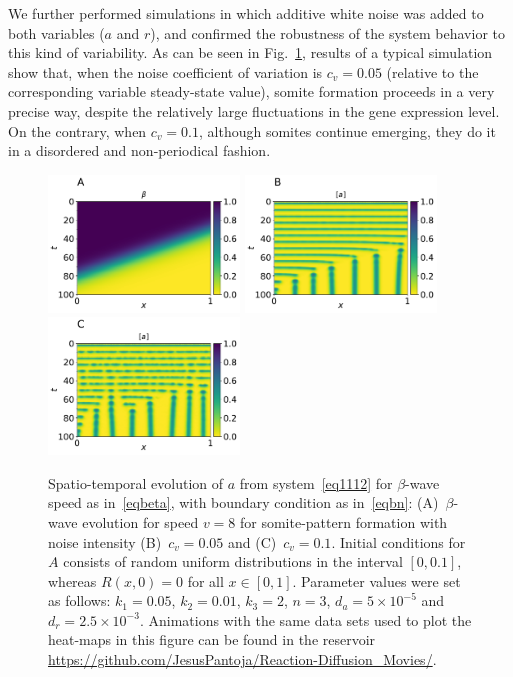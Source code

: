 \documentclass[%
 preprint,
 amsmath,amssymb,
 aps,
]{revtex4-2}
\begin{document}
	We further performed simulations in which additive white noise was added to
	both variables ($a$ and $r$), and confirmed the robustness of the system
	behavior to this kind of variability. As can be seen in Fig.~\ref{Fig05},
	results of a typical simulation show that, when the noise coefficient of
	variation is $c_v = 0.05$ (relative to the corresponding variable 
	steady-state value), somite formation proceeds in a very precise way,
	despite the relatively large fluctuations in the gene expression level. On the
	contrary, when $c_v = 0.1$, although somites continue emerging, they do it in 
	a disordered and non-periodical fashion.
	
	\begin{figure}[t!]
		\centering
		\includegraphics[width=2in]{Figures/Fig05aRev.pdf}
		\includegraphics[width=2in]{Figures/Fig05bRev.pdf} 
		\includegraphics[width=2in]{Figures/Fig05cRev.pdf} 
		\caption{Spatio-temporal evolution of $a$ from system~\eqref{eq1112} for
			$\beta$-wave speed as in~\eqref{eqbeta}, with boundary condition as
			in~\eqref{eqbn}: (A)~$\beta$-wave evolution for speed $v=8$ for somite-pattern
			formation with noise intensity (B)~$c_v=0.05$ and (C)~$c_v=0.1$. Initial
			conditions for $A$ consists of random uniform distributions in the interval $[0,
			0.1]$, whereas $R(x, 0) = 0$ for all $x\in[0,1]$. Parameter values were set as
			follows: $k_1=0.05$, $k_2=0.01$, $k_3=2$, $n=3$,  $d_a = 5\times10^{-5}$
			and~$d_r=2.5\times10^{-3}$. Animations with the same 
			data sets used to plot the heat-maps in this figure can be found in the 
			reservoir \url{https://github.com/JesusPantoja/Reaction-Diffusion_Movies/}.}
		\label{Fig05}
	\end{figure}
	
\end{document}
